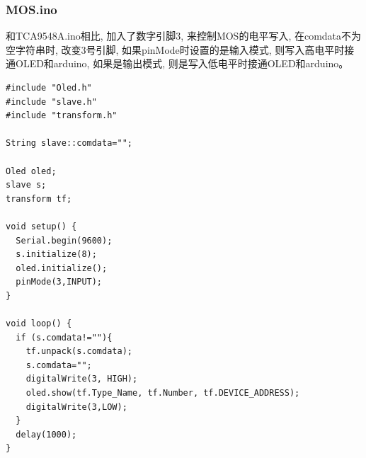 \documentclass{article}
\begin{document}
\subsubsection{MOS.ino}
和TCA9548A.ino相比, 加入了数字引脚3, 来控制MOS的电平写入, 在comdata不为空字符串时, 改变3号引脚, 如果pinMode时设置的是输入模式,
则写入高电平时接通OLED和arduino, 如果是输出模式, 则是写入低电平时接通OLED和arduino。
\begin{lstlisting}
#include "Oled.h"
#include "slave.h"
#include "transform.h"

String slave::comdata="";

Oled oled;
slave s;
transform tf;

void setup() {
  Serial.begin(9600);
  s.initialize(8);
  oled.initialize();
  pinMode(3,INPUT);
}

void loop() {
  if (s.comdata!=""){
    tf.unpack(s.comdata);
    s.comdata="";
    digitalWrite(3, HIGH);  
    oled.show(tf.Type_Name, tf.Number, tf.DEVICE_ADDRESS);
    digitalWrite(3,LOW);
  }
  delay(1000);
}


\end{lstlisting}
\end{document}
